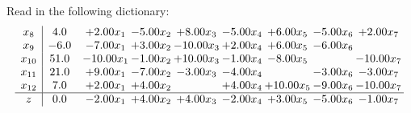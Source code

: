 \documentclass[9pt]{article}
\begin{document}
Read in the following dictionary:
\[\begin{array}{c| c c@{\hskip 2pt} c@{\hskip 2pt} c@{\hskip 2pt} c@{\hskip 2pt} c@{\hskip 2pt} c@{\hskip 2pt} c@{\hskip 2pt} }
 x_{8}   &  4.0 & +  2.00 x_{1} & -5.00 x_{2} & +  8.00 x_{3} & -5.00 x_{4} & +  6.00 x_{5} & -5.00 x_{6} & +  2.00 x_{7}\\
 x_{9}   &  -6.0 & -7.00 x_{1} & +  3.00 x_{2} & -10.00 x_{3} & +  2.00 x_{4} & +  6.00 x_{5} & -6.00 x_{6} &   \\
 x_{10}   &  51.0 & -10.00 x_{1} & -1.00 x_{2} & + 10.00 x_{3} & -1.00 x_{4} & -8.00 x_{5} &   & -10.00 x_{7}\\
 x_{11}   &  21.0 & +  9.00 x_{1} & -7.00 x_{2} & -3.00 x_{3} & -4.00 x_{4} &   & -3.00 x_{6} & -3.00 x_{7}\\
 x_{12}   &  7.0 & +  2.00 x_{1} & +  4.00 x_{2} &   & +  4.00 x_{4} & + 10.00 x_{5} & -9.00 x_{6} & -10.00 x_{7}\\
\hline
z    &  0.0 & -2.00 x_{1} & +  4.00 x_{2} & +  4.00 x_{3} & -2.00 x_{4} & +  3.00 x_{5} & -5.00 x_{6} & -1.00 x_{7}\\
\end{array}\]
\end{document}
